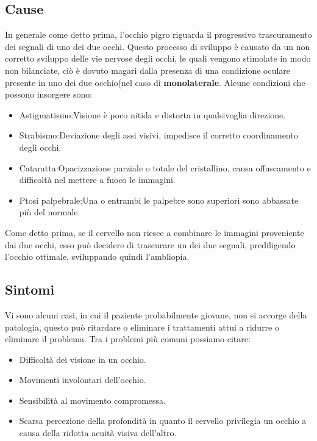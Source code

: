 \documentclass[10pt,a4paper]{article}
\begin{document}
	\subsection{Cause}
	In generale come detto prima, l'occhio pigro riguarda il progressivo trascuramento dei segnali di uno dei due occhi.
	Questo processo di sviluppo è causato da un non corretto sviluppo delle vie nervose degli occhi, le quali vengono stimolate in modo non bilanciate, ciò è dovuto magari dalla presenza di una condizione oculare presente in uno dei due occhio(nel caso di \textbf{monolaterale}.
	Alcune condizioni che possono insorgere sono:
	\begin{itemize}
		\item Astigmatismo:Visione è poco nitida e distorta in qualsivoglia direzione.
		\item Strabismo:Deviazione degli assi visivi, impedisce il corretto coordinamento degli occhi. 
		\item Cataratta:Opacizzazione parziale o totale del cristallino,  causa offuscamento e difficoltà nel mettere a fuoco le immagini.
		\item Ptosi palpebrale:Una o entrambi le palpebre sono superiori sono abbassate più del normale.
	\end{itemize}
	Come detto prima, se il cervello non riesce a combinare le immagini proveniente dai due occhi, esso può decidere di trascurare un dei due segnali, prediligendo l'occhio ottimale, sviluppando quindi l'ambliopia.
	\subsection{Sintomi}
	Vi sono alcuni casi, in cui il paziente probabilmente giovane, non si accorge della patologia, questo può ritardare o eliminare i trattamenti attui a ridurre o eliminare il problema.
	Tra i problemi più comuni possiamo citare:	   
	\begin{itemize}
		\item Difficoltà dei visione in un occhio.
		\item Movimenti involontari dell'occhio.
		\item Sensibilità al movimento compromessa.
		\item Scarsa percezione della profondità in quanto il cervello privilegia un occhio a causa della ridotta acuità visiva dell'altro.
	\end{itemize} 
\newpage   
\end{document}
